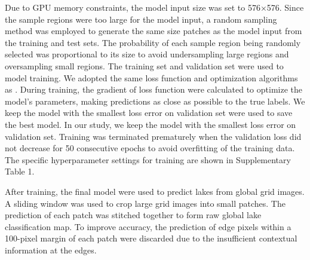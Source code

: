 \documentclass[preprint,12pt,authoryear]{elsarticle}
\begin{document}
Due to GPU memory constraints, the model input size was set to 576×576. Since the sample regions were too large for the model input, a random sampling method was employed to generate the same size patches as the model input from the training and test sets. The probability of each sample region being randomly selected was proportional to its size to avoid undersampling large regions and oversampling small regions. 
The training set and validation set were used to model training. We adopted the same loss function and optimization algorithms as \citet{pi_mapping_2022}. During training, the gradient of loss function were calculated to optimize the model's parameters, making predictions as close as possible to the true labels. We keep the model with the smallest loss error on validation set were used to save the best model. In our study, we keep the model with the smallest loss error on validation set. Training was terminated prematurely when the validation loss did not decrease for 50 consecutive epochs to avoid overfitting of the training data. The specific hyperparameter settings for training are shown in Supplementary Table 1.

After training, the final model were used to predict lakes from global grid images. A sliding window was used to crop large grid images into small patches. The prediction of each patch was stitched together to form raw global lake classification map. To improve accuracy, the prediction of edge pixels within a 100-pixel margin of each patch were discarded due to the insufficient contextual information at the edges. 
\end{document}
